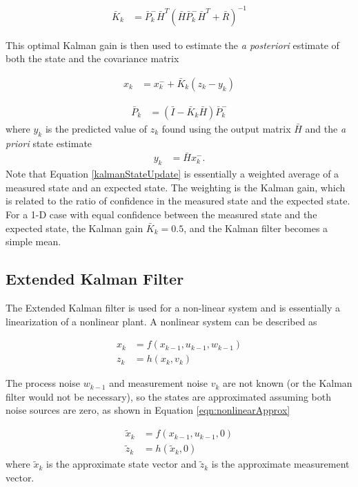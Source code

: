 \begin{align}
\bar{K}_k &=\bar{P}^-_k\bar{H}^T(\bar{H}\bar{P}^-_k\bar{H}^T + \bar{R})^{-1}
\end{align}

This optimal Kalman gain is then used to estimate the \textit{a posteriori} estimate of both the state and the covariance matrix

\begin{align}
\label{kalmanStateUpdate}
x_k &=x^-_k+\bar{K}_k(z_k-y_k)
\end{align}

\begin{align}
\bar{P}_k &= (\bar{I}-\bar{K}_k\bar{H})\bar{P}^-_k
\end{align}
\noindent
where $y_k$ is the predicted value of $z_k$ found using the output matrix $\bar{H}$ and the \textit{a priori} state estimate
\begin{align}
y_k &= \bar{H}x^-_k.
\end{align}
Note that Equation \ref{kalmanStateUpdate} is essentially a weighted average of a measured state and an expected state. The weighting is the Kalman gain, which is related to the ratio of confidence in the measured state and the expected state. For a 1-D case with equal confidence between the measured state and the expected state, the Kalman gain $\bar{K}_k = 0.5$, and the Kalman filter becomes a simple mean.


\subsection*{Extended Kalman Filter}
\label{EKFTheory}
The Extended Kalman filter is used for a non-linear system and is essentially a linearization of a nonlinear plant. A nonlinear system can be described as \cite{welch1995introduction}

\begin{align}
x_k &= f(x_{k-1},u_{k-1},w_{k-1})\\
z_k &= h(x_k,v_k)
\end{align}

The process noise $w_{k-1}$ and measurement noise $v_k$ are not known (or the Kalman filter would not be necessary), so the states are approximated assuming both noise sources are zero, as shown in Equation \ref{eqn:nonlinearApprox}

\begin{align}
\label{eqn:nonlinearApprox}
\tilde{x}_k &= f(x_{k-1},u_{k-1},0)\\
\tilde{z}_k &= h(\tilde{x}_k,0)
\end{align}
\noindent
where $\tilde{x}_k$ is the approximate state vector and $\tilde{z}_k$ is the approximate measurement vector.

